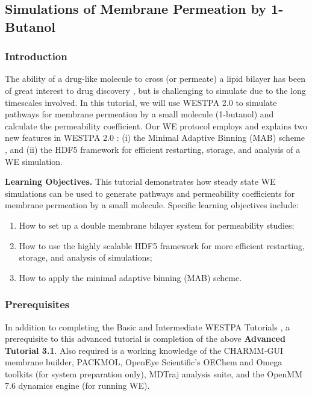 \subsection{Simulations of Membrane Permeation by 1-Butanol}

\subsubsection{Introduction}
The ability of a drug-like molecule to cross (or permeate) a lipid bilayer has been of great interest to drug discovery \citep{zhang_mechanistic_2022}, but is challenging to simulate due to the long timescales involved. 
In this tutorial, we will use WESTPA 2.0 to simulate pathways for membrane permeation by a small molecule (1-butanol) and calculate the permeability coefficient. 
Our WE protocol employs and explains two new features in WESTPA 2.0 \citep{russo_westpa_2022}: (i) the Minimal Adaptive Binning (MAB) scheme \citep{torrillo_minimal_2021}, and (ii) the HDF5 framework for efficient restarting, storage, and analysis of a WE simulation.

\textbf{Learning Objectives.} This tutorial demonstrates how steady state WE simulations can be used to generate pathways and permeability coefficients for membrane permeation by a small molecule.  
Specific learning objectives include:
\begin{enumerate}
    \item How to set up a double membrane bilayer system for permeability studies;
    \item How to use the highly scalable HDF5 framework for more efficient restarting, storage, and analysis of simulations;
    \item How to apply the minimal adaptive binning (MAB) scheme.
\end{enumerate}

\subsubsection{Prerequisites}
In addition to completing the Basic and Intermediate WESTPA Tutorials \citep{bogetti_suite_2019}, a prerequisite to this advanced tutorial is completion of the above \textbf{Advanced Tutorial 3.1}. 
Also required is a working knowledge of the CHARMM-GUI membrane builder, PACKMOL, OpenEye Scientific’s OEChem and Omega toolkits (for system preparation only), MDTraj analysis suite, and the OpenMM 7.6 dynamics engine (for running WE). 

